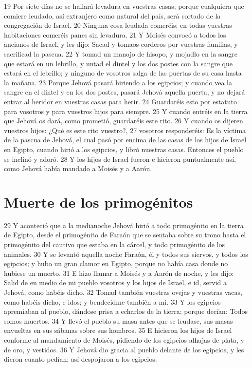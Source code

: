 19 Por siete días no se hallará levadura en vuestras casas; porque cualquiera que comiere leudado, así extranjero como natural del país, será cortado de la congregación de Israel.
20 Ninguna cosa leudada comeréis; en todas vuestras habitaciones comeréis panes sin levadura.
21 Y Moisés convocó a todos los ancianos de Israel, y les dijo: Sacad y tomaos corderos por vuestras familias, y sacrificad la pascua.
22 Y tomad un manojo de hisopo, y mojadlo en la sangre que estará en un lebrillo, y untad el dintel y los dos postes con la sangre que estará en el lebrillo; y ninguno de vosotros salga de las puertas de su casa hasta la mañana.
23 Porque Jehová pasará hiriendo a los egipcios; y cuando vea la sangre en el dintel y en los dos postes, pasará Jehová aquella puerta, y no dejará entrar al heridor en vuestras casas para herir.
24 Guardaréis esto por estatuto para vosotros y para vuestros hijos para siempre.
25 Y cuando entréis en la tierra que Jehová os dará, como prometió, guardaréis este rito.
26 Y cuando os dijeren vuestros hijos: ¿Qué es este rito vuestro?,
27 vosotros responderéis: Es la víctima de la pascua de Jehová, el cual pasó por encima de las casas de los hijos de Israel en Egipto, cuando hirió a los egipcios, y libró nuestras casas. Entonces el pueblo se inclinó y adoró.
28 Y los hijos de Israel fueron e hicieron puntualmente así, como Jehová había mandado a Moisés y a Aarón.

\section*{Muerte de los primogénitos}

29 Y aconteció que a la medianoche Jehová hirió a todo primogénito en la tierra de Egipto, desde el primogénito de Faraón que se sentaba sobre su trono hasta el primogénito del cautivo que estaba en la cárcel, y todo primogénito de los animales.
30 Y se levantó aquella noche Faraón, él y todos sus siervos, y todos los egipcios; y hubo un gran clamor en Egipto, porque no había casa donde no hubiese un muerto.
31 E hizo llamar a Moisés y a Aarón de noche, y les dijo: Salid de en medio de mi pueblo vosotros y los hijos de Israel, e id, servid a Jehová, como habéis dicho.
32 Tomad también vuestras ovejas y vuestras vacas, como habéis dicho, e idos; y bendecidme también a mí.
33 Y los egipcios apremiaban al pueblo, dándose prisa a echarlos de la tierra; porque decían: Todos somos muertos.
34 Y llevó el pueblo su masa antes que se leudase, sus masas envueltas en sus sábanas sobre sus hombros.
35 E hicieron los hijos de Israel conforme al mandamiento de Moisés, pidiendo de los egipcios alhajas de plata, y de oro, y vestidos.
36 Y Jehová dio gracia al pueblo delante de los egipcios, y les dieron cuanto pedían; así despojaron a los egipcios.

